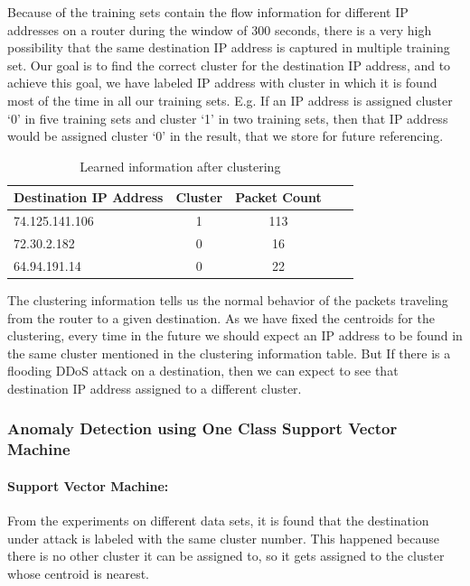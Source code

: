 \documentclass[12pt,oneside,a4paper]{article}
\begin{document}
Because of the training sets contain the flow information for different IP addresses on a router during the window of 300 seconds, there is a very high possibility that the same destination IP address is captured in multiple training set. Our goal is to find the correct cluster for the destination IP address, and to achieve this goal, we have labeled IP address with cluster in which it is found most of the time in all our training sets. E.g. If an IP address is assigned cluster `0' in five training sets and cluster `1' in two training sets, then that IP address would be assigned cluster `0' in the result, that we store for future referencing.

\begin{table}[H]
\centering
  \begin{tabular}{| l | c | c | c | c |}
    \hline
    {Destination IP Address}  &Cluster  &Packet Count \\
    \hline
    74.125.141.106  & 1     & 113  \\ \hline
    72.30.2.182     & 0     & 16   \\ \hline
    64.94.191.14    & 0     & 22   \\ \hline
  \end{tabular}
\caption{Learned information after clustering} \label{table:learned-clustering}
\end{table}

The clustering information tells us the normal behavior of the packets traveling from the router to a given destination. As we have fixed the centroids for the clustering, every time in the future we should expect an IP address to be found in the same cluster mentioned in the clustering information table. But If there is a flooding DDoS attack on a destination, then we can expect to see that destination IP address assigned to a different cluster.

\subsubsection{Anomaly Detection using One Class Support Vector Machine} \label{subsec:Anomaly_Detection}

\paragraph{Support Vector Machine:}

From the experiments on different data sets, it is found that the destination under attack is labeled with the same cluster number. This happened because there is no other cluster it can be assigned to, so it gets assigned to the cluster whose centroid is nearest.
\end{document}
